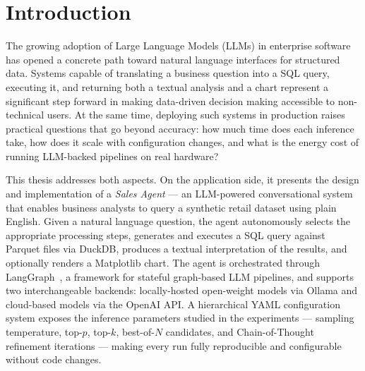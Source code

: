 \section{Introduction}
\label{sec:introduction}
The growing adoption of Large Language Models (LLMs) in enterprise software has opened
a concrete path toward natural language interfaces for structured data. Systems capable of
translating a business question into a SQL query, executing it, and returning both a textual
analysis and a chart represent a significant step forward in making data-driven decision making
accessible to non-technical users. At the same time, deploying such systems in production
raises practical questions that go beyond accuracy: how much time does each inference take,
how does it scale with configuration changes, and what is the energy cost of running LLM-backed
pipelines on real hardware?

This thesis addresses both aspects. On the application side, it presents the design and
implementation of a \textit{Sales Agent} --- an LLM-powered conversational system that enables
business analysts to query a synthetic retail dataset using plain English. Given a natural
language question, the agent autonomously selects the appropriate processing steps, generates
and executes a SQL query against Parquet files via DuckDB, produces a textual interpretation
of the results, and optionally renders a Matplotlib chart. The agent is orchestrated through
LangGraph~\cite{langgraph}, a framework for stateful graph-based LLM pipelines, and supports
two interchangeable backends: locally-hosted open-weight models via Ollama and cloud-based
models via the OpenAI API. A hierarchical YAML configuration system exposes the inference
parameters studied in the experiments --- sampling temperature, top-$p$, top-$k$, best-of-$N$ candidates, and
Chain-of-Thought refinement iterations --- making every run fully reproducible and configurable
without code changes.

